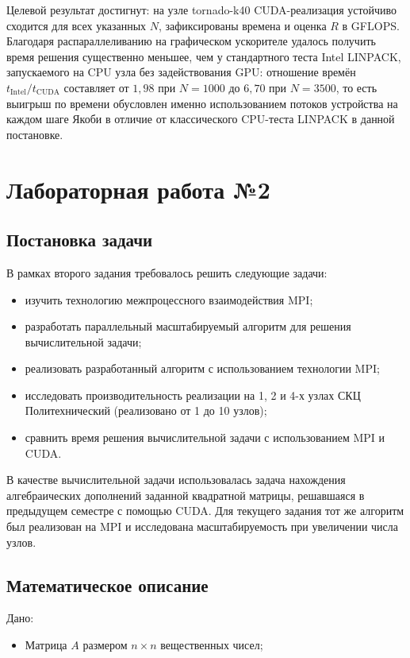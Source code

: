 \documentclass[areasetadvanced]{scrartcl}
\begin{document}
Целевой результат достигнут: на узле tornado-k40 CUDA-реализация устойчиво сходится для всех указанных $N$, зафиксированы времена и оценка $R$ в GFLOPS.
Благодаря распараллеливанию на графическом ускорителе удалось получить время решения существенно меньшее, чем у стандартного теста Intel LINPACK, запускаемого на CPU узла без задействования GPU: отношение времён $t_{\mathrm{Intel}}/t_{\mathrm{CUDA}}$ составляет от $1{,}98$ при $N=1000$ до $6{,}70$ при $N=3500$, то есть выигрыш по времени обусловлен именно использованием потоков устройства на каждом шаге Якоби в отличие от классического CPU-теста LINPACK в данной постановке.

\newpage
\section{Лабораторная работа №2}

\subsection{Постановка задачи}

В рамках второго задания требовалось решить следующие задачи:
\begin{itemize}
\item изучить технологию межпроцессного взаимодействия MPI;
\item разработать параллельный масштабируемый алгоритм для решения вычислительной задачи;
\item реализовать разработанный алгоритм с использованием технологии MPI;
\item исследовать производительность реализации на 1, 2 и 4-х узлах СКЦ Политехнический (реализовано от 1 до 10 узлов);
\item сравнить время решения вычислительной задачи с использованием MPI и CUDA.
\end{itemize}

В качестве вычислительной задачи использовалась задача нахождения алгебраических дополнений заданной квадратной матрицы, решавшаяся в предыдущем семестре с помощью CUDA.
Для текущего задания тот же алгоритм был реализован на MPI и исследована масштабируемость при увеличении числа узлов.

\subsection{Математическое описание}

Дано:
\begin{itemize}
    \item Матрица $A$ размером $n \times n$ вещественных чисел;
\end{itemize}
\end{document}
